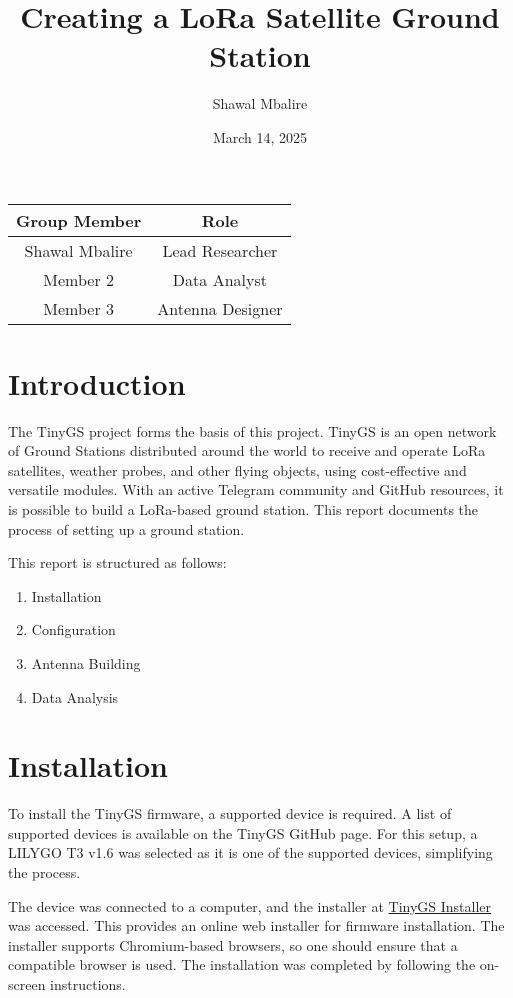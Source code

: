 \documentclass{article}
\title{Creating a LoRa Satellite Ground Station}
\author{Shawal Mbalire}
\date{March 14, 2025}
\begin{document}
\maketitle

\begin{center}
    \begin{tabular}{|c|c|}
        \hline
        \textbf{Group Member} & \textbf{Role} \\
        \hline
        Shawal Mbalire & Lead Researcher \\
        \hline
        Member 2 & Data Analyst \\
        \hline
        Member 3 & Antenna Designer \\
        \hline
    \end{tabular}
\end{center}

\section{Introduction}
The TinyGS project \cite{tinygs} forms the basis of this project. TinyGS is an open network of Ground Stations distributed around the world to receive and operate LoRa satellites, weather probes, and other flying objects, using cost-effective and versatile modules. With an active Telegram community and GitHub resources, it is possible to build a LoRa-based ground station. This report documents the process of setting up a ground station.

This report is structured as follows:
\begin{enumerate}
    \item Installation
    \item Configuration
    \item Antenna Building
    \item Data Analysis
\end{enumerate}

\section{Installation}
To install the TinyGS firmware, a supported device is required. A list of supported devices is available on the TinyGS GitHub page. For this setup, a LILYGO T3 v1.6 was selected as it is one of the supported devices, simplifying the process.

The device was connected to a computer, and the installer at \href{http://installer.tinygs.com}{TinyGS Installer} was accessed. This provides an online web installer for firmware installation. The installer supports Chromium-based browsers, so one should ensure that a compatible browser is used. The installation was completed by following the on-screen instructions.
\end{document}
